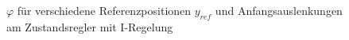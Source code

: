 \documentclass[
	pagesize,
	fontsize=12pt,
	paper=a4,
	oneside,
   reqno
]{scrartcl}
\begin{document}
\begin{figure}[H]
    \centering
    \caption[$\varphi$ für Regler mit I-Regelung]{$\varphi$ für verschiedene Referenzpositionen $y_{ref}$ und Anfangsauslenkungen am Zustandsregler mit I-Regelung}
    \label{fig:Bild18}
\end{figure}
\end{document}
